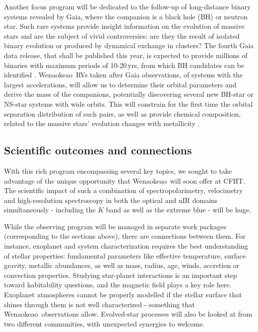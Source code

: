 \documentclass[
    traditabstract,
    longauth,
    onecolumn,
]{aa}
\def \wena{Wenaokeao}
\begin{document}
Another focus program will be dedicated to the follow-up of long-distance binary systems revealed by Gaia, where the companion is a black hole (BH) or neutron star. Such rare systems provide insight information on the evolution of massive stars and are the subject of vivid controversies: are they the result of isolated binary evolution or produced by dynamical exchange in clusters? The fourth Gaia data release, that shall be published this year, is expected to provide millions of binaries with maximum periods of 10-20\,yrs, from which BH candidates can be identified \citep[e.g., Gaia BH3 ][]{gaia_collaboration_discovery_2024}.
\wena\ RVs taken after Gaia observations, of systems with the largest accelerations, will allow us to determine their orbital parameters and derive the mass of the companions, potentially discovering several new BH-star or NS-star systems with wide orbits. This will constrain for the first time the orbital separation distribution of such pairs, as well as provide chemical composition, related to the massive stars’ evolution changes with metallicity \citep{el-badry_formation_2024}.


\subsection{Scientific outcomes and connections}
With this rich program encompassing several key topics, we sought to take advantage of the unique opportunity that \wena\ will soon offer at CFHT. The scientific impact of such a combination of spectropolarimetry, velocimetry and high-resolution spectroscopy in both the optical and nIR domains simultaneously - including the $K$ band as well as the extreme blue - will be huge.

While the observing program will be managed in separate work packages (corresponding to the sections above), there are connections between them. For instance, exoplanet and system characterization requires the best understanding of stellar properties: fundamental parameters like effective temperature, surface gravity, metallic abundances, as well as mass, radius, age, winds, accretion or convection properties. Studying star-planet interactions is an important step toward habitability questions, and the magnetic field plays a key role here. Exoplanet atmospheres cannot be properly modelled if the stellar surface that shines through them is not well characterized - something that \wena\ observations allow. Evolved-star processes will also be looked at from two different communities, with unexpected synergies to welcome. 
\end{document}
